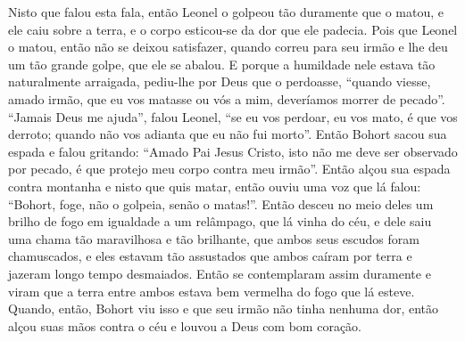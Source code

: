 Nisto que falou esta fala, então Leonel o golpeou tão duramente que o matou, e
ele caiu sobre a terra, e o corpo esticou-se da dor que ele padecia. Pois que
Leonel o matou, então não se deixou satisfazer, quando correu para seu irmão e
lhe deu um tão grande golpe, que ele se abalou. E porque a humildade nele
estava tão naturalmente arraigada, pediu-lhe por Deus que o perdoasse, “quando
viesse, amado irmão, que eu vos matasse ou vós a mim, deveríamos morrer de
pecado”. “Jamais Deus me ajuda”, falou Leonel, “se eu vos perdoar, eu vos mato,
é que vos derroto; quando não vos adianta que eu não fui morto”. Então Bohort
sacou sua espada e falou gritando: “Amado Pai Jesus Cristo, isto não me deve
ser observado por pecado, é que protejo meu corpo contra meu irmão”. Então
alçou sua espada contra montanha e nisto que quis matar, então ouviu uma voz
que lá falou: “Bohort, foge, não o golpeia, senão o matas!”. Então desceu no
meio deles um brilho de fogo em igualdade a um relâmpago, que lá vinha do céu,
e dele saiu uma chama tão maravilhosa e tão brilhante, que ambos seus escudos
foram chamuscados, e eles estavam tão assustados que ambos caíram por terra e
jazeram longo tempo desmaiados. Então se contemplaram assim
duramente e viram que a terra entre ambos estava bem vermelha do fogo que lá
esteve. Quando, então, Bohort viu isso e que seu irmão não tinha nenhuma dor,
então alçou suas mãos contra o céu e louvou a Deus com bom coração. 

